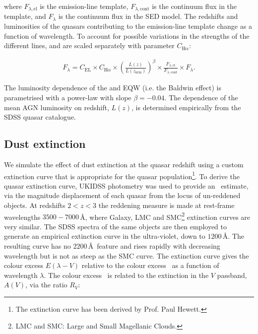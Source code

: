 \noindent where $F_{\lambda, \text{el}}$ is the emission-line template, $F_{\lambda,\text{cont}}$ is the continuum flux in the template, and $F_{\lambda}$ is the continuum flux in the SED model.
The redshifts and luminosities of the quasars contributing to the emission-line template change as a function of wavelength. 
To account for possible variations in the strengths of the different lines, \ha and \hb are scaled separately with parameter $C_{{\text{H}} \alpha}$: 

\begingroup\makeatletter{}\check@mathfonts
\begin{eqnarray}
  F_{\lambda} =  C_{\text{EL}} \times C_{{\text{H}} \alpha} \times \left( \frac{L(z)} {L(z_{\text{nrm}})} \right)^{\beta} \times \frac{F_{\lambda, \text{el}}}{F_{\lambda, \text{cont}}} \times F_{\lambda}.
\end{eqnarray}
\endgroup

\noindent The luminosity dependence of the \ha and \hb EQW (i.e. the Baldwin effect) is parametrised with a power-law with slope $\beta=-0.04$.
The dependence of the mean AGN luminosity on redshift, $L(z)$, is determined empirically from the SDSS quasar catalogue. 

\subsection{Dust extinction}
\label{sec:sed-extinction} 

We simulate the effect of dust extinction at the quasar redshift using a custom extinction curve that is appropriate for the quasar population\footnote{The extinction curve has been derived by Prof. Paul Hewett.}.
To derive the quasar extinction curve, UKIDSS photometry was used to provide an \ebv\, estimate, via the magnitude displacement of each quasar from the locus of un-reddened objects. 
At redshifts $2 < z < 3$ the reddening measure is made at rest-frame wavelengths $3500-7000$\,\AA, where Galaxy, LMC and SMC\footnote{LMC and SMC: Large and Small Magellanic Clouds.} extinction curves are very similar. 
The SDSS spectra of the same objects are then employed to generate an empirical extinction curve in the ultra-violet, down to $1200$\,\AA. 
The resulting curve has no $2200$\,\AA\, feature and rises rapidly with decreasing wavelength but is not as steep as the SMC curve. 
The extinction curve gives the colour excess $E(\lambda-V)$ relative to the colour excess \ebv\, as a function of wavelength $\lambda$. 
The colour excess \ebv\, is related to the extinction in the $V$ passband, $A(V)$, via the ratio $R_V$: 

